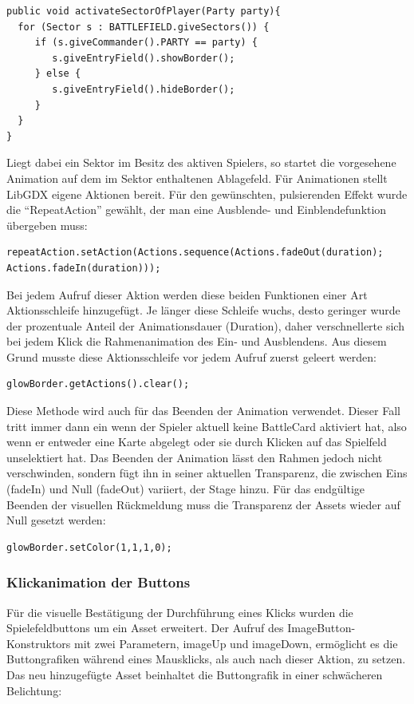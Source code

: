 \begin{lstlisting}
public void activateSectorOfPlayer(Party party){
  for (Sector s : BATTLEFIELD.giveSectors()) {
     if (s.giveCommander().PARTY == party) {
        s.giveEntryField().showBorder();
     } else {
        s.giveEntryField().hideBorder();
     }
  }
}
\end{lstlisting}

Liegt dabei ein Sektor im Besitz des aktiven Spielers, so startet die vorgesehene Animation auf dem im Sektor enthaltenen Ablagefeld.
Für Animationen stellt LibGDX eigene Aktionen bereit. Für den gewünschten, pulsierenden Effekt wurde die “RepeatAction” gewählt, der man eine Ausblende- und Einblendefunktion übergeben muss:

\begin{lstlisting}
repeatAction.setAction(Actions.sequence(Actions.fadeOut(duration);
Actions.fadeIn(duration)));
\end{lstlisting}

Bei jedem Aufruf dieser Aktion werden diese beiden Funktionen einer Art Aktionsschleife hinzugefügt. Je länger diese Schleife wuchs, desto geringer wurde der prozentuale Anteil der Animationsdauer (Duration), daher verschnellerte sich bei jedem Klick die Rahmenanimation des Ein- und Ausblendens. Aus diesem Grund musste diese Aktionsschleife vor jedem Aufruf zuerst geleert werden:

\begin{lstlisting}
glowBorder.getActions().clear();
\end{lstlisting}

Diese Methode wird auch für das Beenden der Animation verwendet. Dieser Fall tritt immer dann ein wenn der Spieler aktuell keine BattleCard aktiviert hat, also wenn er entweder eine Karte abgelegt oder sie durch Klicken auf das Spielfeld unselektiert hat.
Das Beenden der Animation lässt den Rahmen jedoch nicht verschwinden, sondern fügt ihn in seiner aktuellen Transparenz, die zwischen Eins (fadeIn) und Null (fadeOut) variiert, der Stage hinzu. Für das endgültige Beenden der visuellen Rückmeldung muss die Transparenz der Assets wieder auf Null gesetzt werden:

\begin{lstlisting}
glowBorder.setColor(1,1,1,0);
\end{lstlisting}

\subsubsection{Klickanimation der Buttons}
Für die visuelle Bestätigung der Durchführung eines Klicks wurden die Spielefeldbuttons um ein Asset erweitert. Der Aufruf des ImageButton-Konstruktors mit zwei Parametern, imageUp und imageDown, ermöglicht es die Buttongrafiken während eines Mausklicks, als auch nach dieser Aktion, zu setzen. Das neu hinzugefügte Asset beinhaltet die Buttongrafik in einer schwächeren Belichtung:

